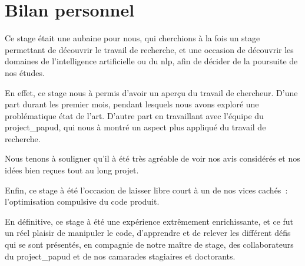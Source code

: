 \section{Bilan personnel}
Ce stage était une aubaine pour nous, qui cherchions à la fois un stage permettant de découvrir le travail de recherche, et une occasion de découvrir les domaines de l'intelligence artificielle ou du \gls{nlp}, afin de décider de la poursuite de nos études.

En effet, ce stage nous à permis d'avoir un aperçu du travail de chercheur. D'une part durant les premier mois, pendant lesquels nous avons exploré une problématique état de l'art. D'autre part en travaillant avec l'équipe du \gls{project_papud}, qui nous à montré un aspect plus appliqué du travail de recherche.

Nous tenons à souligner qu'il à été très agréable de voir nos avis considérés et nos idées bien reçues tout au long projet.

Enfin, ce stage à été l'occasion de laisser libre court à un de nos vices cachés~: l'optimisation compulsive du code produit.

En définitive, ce stage à été une expérience extrêmement enrichissante, et ce fut un réel plaisir de manipuler le code, d'apprendre et de relever les différent défis qui se sont présentés, en compagnie de notre maître de stage, des collaborateurs du \gls{project_papud} et de nos camarades stagiaires et doctorants.









